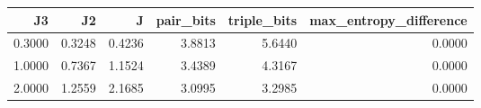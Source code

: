 \begin{tabular}{rrrrrr}
\toprule
J3 & J2 & J & pair_bits & triple_bits & max_entropy_difference \\
\midrule
0.3000 & 0.3248 & 0.4236 & 3.8813 & 5.6440 & 0.0000 \\
1.0000 & 0.7367 & 1.1524 & 3.4389 & 4.3167 & 0.0000 \\
2.0000 & 1.2559 & 2.1685 & 3.0995 & 3.2985 & 0.0000 \\
\bottomrule
\end{tabular}
